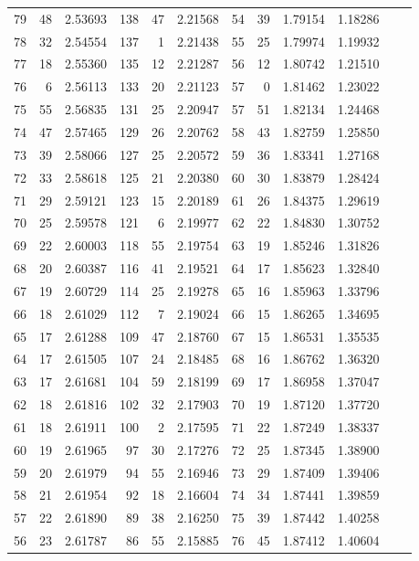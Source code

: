 \documentclass[12pt,a4paper]{article}
\begin{document}
\begin{small}
\begin{longtable}{@{}rr|rr|rr|rr|rr|rr@{}}
79 & 48 & 2.53693 & 138 & 47 & 2.21568 & 54 & 39 & 1.79154 & 1.18286 \\
78 & 32 & 2.54554 & 137 & 1 & 2.21438 & 55 & 25 & 1.79974 & 1.19932 \\
77 & 18 & 2.55360 & 135 & 12 & 2.21287 & 56 & 12 & 1.80742 & 1.21510 \\
76 & 6 & 2.56113 & 133 & 20 & 2.21123 & 57 & 0 & 1.81462 & 1.23022 \\
75 & 55 & 2.56835 & 131 & 25 & 2.20947 & 57 & 51 & 1.82134 & 1.24468 \\
74 & 47 & 2.57465 & 129 & 26 & 2.20762 & 58 & 43 & 1.82759 & 1.25850 \\
73 & 39 & 2.58066 & 127 & 25 & 2.20572 & 59 & 36 & 1.83341 & 1.27168 \\
72 & 33 & 2.58618 & 125 & 21 & 2.20380 & 60 & 30 & 1.83879 & 1.28424 \\
71 & 29 & 2.59121 & 123 & 15 & 2.20189 & 61 & 26 & 1.84375 & 1.29619 \\
70 & 25 & 2.59578 & 121 & 6 & 2.19977 & 62 & 22 & 1.84830 & 1.30752 \\
69 & 22 & 2.60003 & 118 & 55 & 2.19754 & 63 & 19 & 1.85246 & 1.31826 \\
68 & 20 & 2.60387 & 116 & 41 & 2.19521 & 64 & 17 & 1.85623 & 1.32840 \\
67 & 19 & 2.60729 & 114 & 25 & 2.19278 & 65 & 16 & 1.85963 & 1.33796 \\
66 & 18 & 2.61029 & 112 & 7 & 2.19024 & 66 & 15 & 1.86265 & 1.34695 \\
65 & 17 & 2.61288 & 109 & 47 & 2.18760 & 67 & 15 & 1.86531 & 1.35535 \\
64 & 17 & 2.61505 & 107 & 24 & 2.18485 & 68 & 16 & 1.86762 & 1.36320 \\
63 & 17 & 2.61681 & 104 & 59 & 2.18199 & 69 & 17 & 1.86958 & 1.37047 \\
62 & 18 & 2.61816 & 102 & 32 & 2.17903 & 70 & 19 & 1.87120 & 1.37720 \\
61 & 18 & 2.61911 & 100 & 2 & 2.17595 & 71 & 22 & 1.87249 & 1.38337 \\
60 & 19 & 2.61965 & 97 & 30 & 2.17276 & 72 & 25 & 1.87345 & 1.38900 \\
59 & 20 & 2.61979 & 94 & 55 & 2.16946 & 73 & 29 & 1.87409 & 1.39406 \\
58 & 21 & 2.61954 & 92 & 18 & 2.16604 & 74 & 34 & 1.87441 & 1.39859 \\
57 & 22 & 2.61890 & 89 & 38 & 2.16250 & 75 & 39 & 1.87442 & 1.40258 \\
56 & 23 & 2.61787 & 86 & 55 & 2.15885 & 76 & 45 & 1.87412 & 1.40604 \\

\end{longtable}
\end{small}
\end{document}
